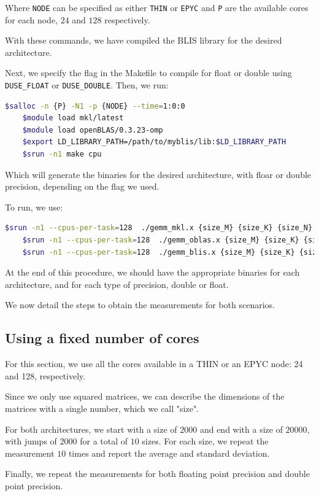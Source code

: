 \documentclass{report}
\begin{document}
Where \texttt{NODE} can be specified as either \texttt{THIN} or \texttt{EPYC} and 
\texttt{P} are the available cores for each node, $24$ and $128$ respectively.

With these commands, we have compiled the BLIS library for the desired 
architecture.

Next, we specify the flag in the Makefile to compile for float or double using 
\texttt{\-DUSE\_FLOAT} or \texttt{\-DUSE\_DOUBLE}. Then, we run:
\begin{lstlisting}[language=bash]
    $salloc -n {P} -N1 -p {NODE} --time=1:0:0
    $module load mkl/latest
    $module load openBLAS/0.3.23-omp
    $export LD_LIBRARY_PATH=/path/to/myblis/lib:$LD_LIBRARY_PATH
    $srun -n1 make cpu
\end{lstlisting}

Which will generate the binaries for the desired architecture, with floar or 
double precision, depending on the flag we used.

To run, we use: 
\begin{lstlisting}[language=bash]
    $srun -n1 --cpus-per-task=128  ./gemm_mkl.x {size_M} {size_K} {size_N}
    $srun -n1 --cpus-per-task=128  ./gemm_oblas.x {size_M} {size_K} {size_N}
    $srun -n1 --cpus-per-task=128  ./gemm_blis.x {size_M} {size_K} {size_N}
\end{lstlisting}

At the end of this procedure, we should have the appropriate binaries for each 
architecture, and for each type of precision, double or float.

We now detail the steps to obtain the measurements for both scenarios.

\subsection{Using a fixed number of cores}

For this section, we use all the cores available in a THIN or an EPYC node: 24 
and 128, respectively. 

Since we only use squared matrices, we can describe the dimensions of the matrices 
with a single number, which we call "size". 

For both architectures, we start with a size of $2000$ and end with a size of 
$20000$, with jumps of $2000$ for a total of $10$ sizes. For each size, 
we repeat the measurement $10$ times and report the average and standard 
deviation.

Finally, we repeat the measurements for both floating point precision and double 
point precision.
\end{document}
